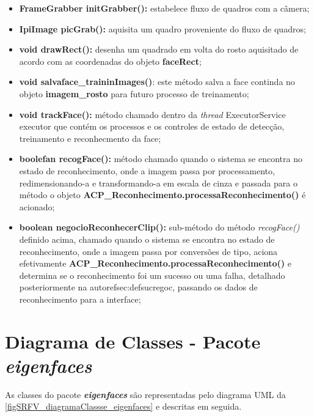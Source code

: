 \begin{itemize}
\begin{itemize}
		\item \textbf{FrameGrabber initGrabber():} estabelece fluxo de quadros com a câmera;
		
		\item \textbf{IpiImage picGrab():} aquisita um quadro proveniente do fluxo de quadros;
		
		\item \textbf{void drawRect():} desenha um quadrado em volta do rosto aquisitado de acordo com as coordenadas do objeto \textbf{faceRect};
		
		\item \textbf{void salvaface\_traininImages()}: este método salva a face continda no objeto \textbf{imagem\_rosto} para futuro processo de treinamento;
		
		\item \textbf{void trackFace():} método chamado dentro da \textit{thread} ExecutorService executor que contém os processos e os controles de estado de detecção, treinamento e reconhecmento da face;
		
		\item \textbf{boolefan recogFace():} método chamado quando o sistema se encontra no estado de reconhecimento, onde a imagem passa por processamento, redimensionando-a e transformando-a em escala de cinza e passada para o método o objeto \textbf{ACP\_Reconhecimento.processaReconhecimento()} é acionado;
		
		\item \textbf{boolean negocioReconhecerClip():} sub-método do método \textit{recogFace()} definido acima, chamado quando o sistema se encontra no estado de reconhecimento, onde a imagem passa por conversões de tipo,  aciona efetivamente \textbf{ACP\_Reconhecimento.processaReconhecimento()} e determina se o reconhecimento foi um sucesso ou uma falha, detalhado posteriormente na autoref{sec:defsucregoc}, passando os dados de reconhecimento para a interface;
	\end{itemize}
\end{itemize}





\section{Diagrama de Classes - Pacote \textit{\textbf{eigenfaces}}}\label{sec:eigenfacesclass}
As classes do pacote \textbf{\textit{eigenfaces}} são representadas pelo diagrama UML da \autoref{figSRFV_diagramaClassse_eigenfaces} e descritas em seguida. 

